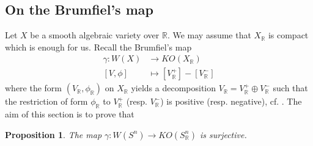 \documentclass[psamsfonts]{amsart}
\theoremstyle{plain}
\theoremstyle{theorem}
\newtheorem{Prop}[theo]{\bf Proposition}
\theoremstyle{definition}
\newcommand{\R}{\mathbb{R}}
\newcommand{\W}{W}
\begin{document}
\subsection{On the Brumfiel's map} Let $X$ be a smooth algebraic variety over $\R$. We may assume that $X_\R$ is compact which is enough for us. Recall the Brumfiel's map 
\begin{align*}
	\gamma:  \W(X) &\to KO(X_\R) \\
	[V,\phi] & \mapsto [V_\R^+] - [V_\R^-]
\end{align*} 
where the form $(V_\R,\phi_\R)$ on $X_\R$ yields a decomposition $V_\R = V_\R^+ \oplus V_\R^-$ such that the restriction of form $\phi_\R$ to $V_\R^+$ (resp. $V_\R^-$) is positive (resp. negative), cf. \cite[Chapter I.8]{Karoubi78}. 
The aim of this section is to prove that 
\begin{Prop}\label{prop:brumfiel-surj}
	The map $\gamma: \W(S^n) \to KO(S^n_{\R})$ is surjective. 
\end{Prop}
\end{document}
